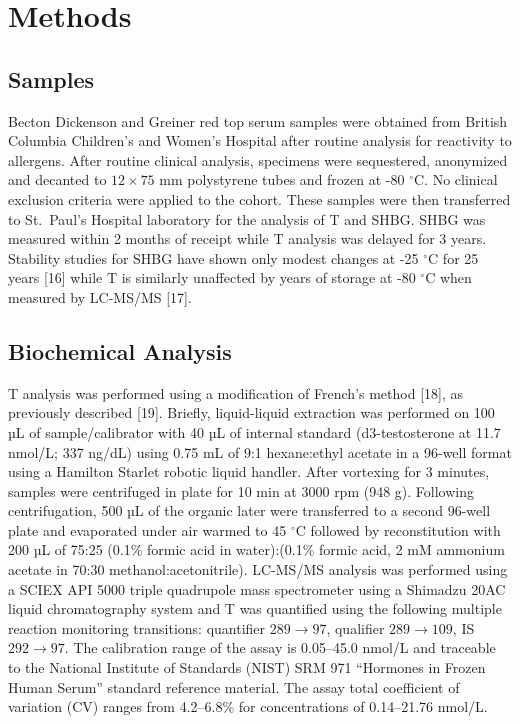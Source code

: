 \documentclass[]{elsarticle} %
\begin{document}
\hypertarget{methods}{%
\section{Methods}\label{methods}}

\hypertarget{samples}{%
\subsection{Samples}\label{samples}}

Becton Dickenson and Greiner red top serum samples were obtained from
British Columbia Children's and Women's Hospital after routine analysis
for reactivity to allergens. After routine clinical analysis, specimens
were sequestered, anonymized and decanted to \(12\times 75\) mm
polystyrene tubes and frozen at -80 \(^{\circ}\)C. No clinical exclusion
criteria were applied to the cohort. These samples were then transferred
to St.~Paul's Hospital laboratory for the analysis of T and SHBG. SHBG
was measured within 2 months of receipt while T analysis was delayed for
3 years. Stability studies for SHBG have shown only modest changes at
-25 \(^{\circ}\)C for 25 years {[}16{]} while T is similarly unaffected
by years of storage at -80 \(^{\circ}\)C when measured by LC-MS/MS
{[}17{]}.

\hypertarget{biochemical-analysis}{%
\subsection{Biochemical Analysis}\label{biochemical-analysis}}

T analysis was performed using a modification of French's method
{[}18{]}, as previously described {[}19{]}. Briefly, liquid-liquid
extraction was performed on 100 µL of sample/calibrator with 40 µL of
internal standard (d3-testosterone at 11.7 nmol/L; 337 ng/dL) using 0.75
mL of 9:1 hexane:ethyl acetate in a 96-well format using a Hamilton
Starlet robotic liquid handler. After vortexing for 3 minutes, samples
were centrifuged in plate for 10 min at 3000 rpm (948 g). Following
centrifugation, 500 µL of the organic later were transferred to a second
96-well plate and evaporated under air warmed to 45 \(^{\circ}\)C
followed by reconstitution with 200 µL of 75:25 (0.1\% formic acid in
water):(0.1\% formic acid, 2 mM ammonium acetate in 70:30
methanol:acetonitrile). LC-MS/MS analysis was performed using a SCIEX
API 5000 triple quadrupole mass spectrometer using a Shimadzu 20AC
liquid chromatography system and T was quantified using the following
multiple reaction monitoring transitions: quantifier \(289 \to 97\),
qualifier \(289 \to 109\), IS \(292 \to 97\). The calibration range of
the assay is 0.05--45.0 nmol/L and traceable to the National Institute
of Standards (NIST) SRM 971 ``Hormones in Frozen Human Serum'' standard
reference material. The assay total coefficient of variation (CV) ranges
from 4.2--6.8\% for concentrations of 0.14--21.76 nmol/L.
\end{document}
